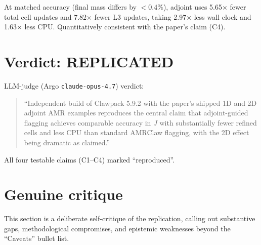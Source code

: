 \documentclass[11pt]{article}
\begin{document}
At matched accuracy (final mass differs by $<0.4\%$), adjoint uses
5.65$\times$ fewer total cell updates and 7.82$\times$ fewer L3 updates,
taking 2.97$\times$ less wall clock and 1.63$\times$ less CPU.
Quantitatively consistent with the paper's claim (C4).

\section{Verdict: REPLICATED}

LLM-judge (Argo \texttt{claude-opus-4.7}) verdict:
\begin{quote}
``Independent build of Clawpack 5.9.2 with the paper's shipped 1D and 2D
adjoint AMR examples reproduces the central claim that adjoint-guided flagging
achieves comparable accuracy in $J$ with substantially fewer refined cells and
less CPU than standard AMRClaw flagging, with the 2D effect being dramatic as
claimed.''
\end{quote}
All four testable claims (C1--C4) marked ``reproduced''.

\section{Genuine critique}

This section is a deliberate self-critique of the replication, calling out
substantive gaps, methodological compromises, and epistemic weaknesses beyond
the ``Caveats'' bullet list.
\end{document}
